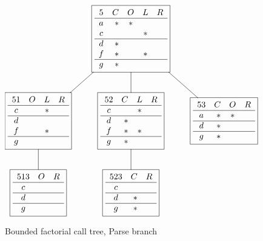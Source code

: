 \documentclass[11pt]{article}
\begin{document}
  \begin{figure}
\centering
\[ \xymatrix{
  &*+ [F]{
   \begin{array}{crccl}
     5&C&O&L&R\\ \hline
      a&* & * &   &   \\
      c&  &   & * &   \\ \hline
      d&* &   &   &   \\
      f&* &   & * &   \\ \hline
      g&* &   &   &   \\
    \end{array}} \ar@{-}[dl]\ar@{-}[d]\ar@{-}[dr]
  &&\\
  *+ [F]{
   \begin{array}{crcl}
     51&O&L&R\\ \hline
      c&   & * &   \\ \hline
      d&   &   &   \\
      f&   & * &   \\ \hline
      g&   &   &   \\
    \end{array}}\ar@{-}[d]
  &*+ [F]{
   \begin{array}{crcl}
     52&C&L&R\\ \hline
      c&  & * &   \\ \hline
      d&* &   &   \\
      f&* & * &   \\ \hline
      g&* &   &   \\
    \end{array}}\ar@{-}[d]
  &*+ [F]{
   \begin{array}{crcl}
     53&C&O&R\\ \hline
      a&* & * &   \\ \hline
      d&* &   &   \\ \hline
      g&* &   &   \\
    \end{array}}\\
  *+ [F]{
   \begin{array}{crl}
     513&O&R\\ \hline
      c &   &   \\ \hline
      d &   &   \\ \hline
      g &   &   \\
    \end{array}}
  &*+ [F]{
    \begin{array}{crl}
      523&C&R\\ \hline
      c&  &   \\ \hline
      d&* &   \\ \hline
      g&* &   \\
    \end{array}}
  &&\\
}\]
  \caption{Bounded factorial call tree, {\sc Parse} branch}
  \label{bounded-cosus-cosme-cost5}
\end{figure}
\end{document}
